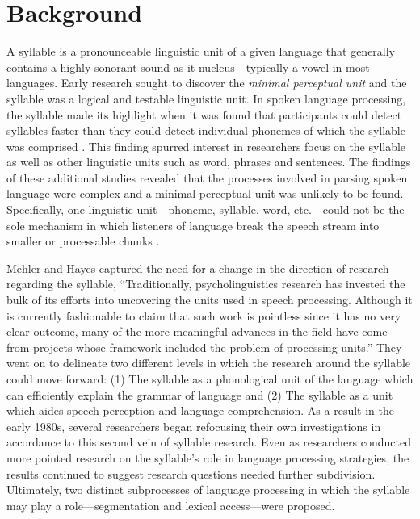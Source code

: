 \section{Background}
A syllable is a pronounceable linguistic unit of a given language that generally contains a highly sonorant sound as it nucleus—typically a vowel in most languages. Early research sought to discover the \emph{minimal perceptual unit} and the syllable was a logical and testable linguistic unit. In spoken language processing, the syllable made its highlight when it was found that participants could detect syllables faster than they could detect individual phonemes of which the syllable was comprised \citep*{Savin1970-oy}. This finding spurred interest in researchers focus on the syllable as well as other linguistic units such as word, phrases and sentences. The findings of these additional studies revealed that the processes involved in parsing spoken language were complex and a minimal perceptual unit was unlikely to be found. %
Specifically, one linguistic unit—phoneme, syllable, word, etc.—could not be the sole mechanism in which listeners of language break the speech stream into smaller or processable chunks \citep{Foss1973-ll,Healy1976-js,McNeill1973-bo}. 

Mehler and Hayes \parencite*{Mehler1981-wp} captured the need for a change in the direction of research regarding the syllable, “Traditionally, psycholinguistics research has invested the bulk of its efforts into uncovering the units used in speech processing. Although it is currently fashionable to claim that such work is pointless since it has no very clear outcome, many of the more meaningful advances in the field have come from projects whose framework included the problem of processing units.” They went on to delineate two different levels in which the research around the syllable could move forward: (1) The syllable as a phonological unit of the language which can efficiently explain the grammar of language and (2) The syllable as a unit which aides speech perception and language comprehension. As a result in the early 1980s, several researchers began refocusing their own investigations in accordance to this second vein of syllable research. %
Even as researchers conducted more pointed research on the syllable's role in language processing strategies, the results continued to suggest research questions needed further subdivision. Ultimately, two distinct subprocesses of language processing in which the syllable may play a role---segmentation and lexical access---were proposed. 


